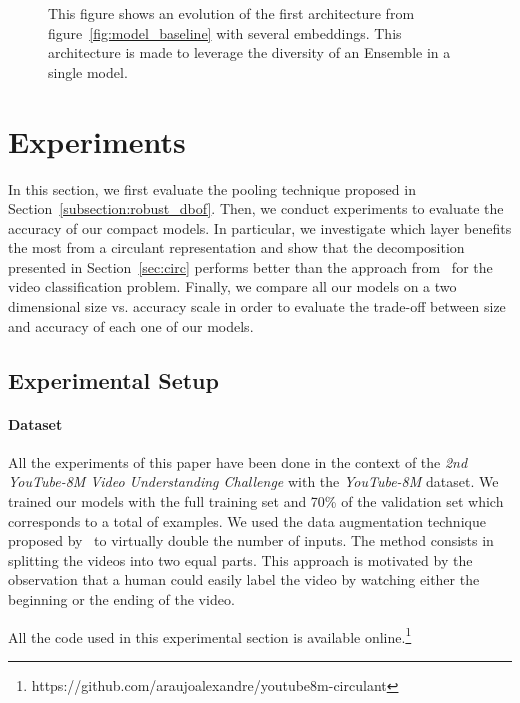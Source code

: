 \documentclass[runningheads]{llncs}
\newcommand{\yt}{\textit{YouTube-8M}\xspace}
\begin{document}
\begin{figure}[ht]
  \centering
  \scalebox{.75}{}
  \caption{This figure shows an evolution of the first architecture from figure~\ref{fig:model_baseline} with several embeddings. This architecture is made to leverage the diversity of an Ensemble in a single model.}
  \label{fig:diverstiy_architecture}
\end{figure}



\section{Experiments}
\label{sec:xp}

In this section, we first evaluate the pooling technique proposed in Section~\ref{subsection:robust_dbof}. Then, we conduct experiments to evaluate the accuracy of our compact models. In particular, we investigate which layer benefits the most from a circulant representation and show that the decomposition presented in Section~\ref{sec:circ} performs better than the  approach from~\cite{7410684} for the video classification problem. Finally, we compare all our models on a two dimensional size vs. accuracy scale in order to evaluate the trade-off between size and accuracy of each one of our models. 


\subsection{Experimental Setup}
\paragraph*{\textbf{Dataset}}
All the experiments of this paper have been done in the context of the \textit{2nd YouTube-8M Video Understanding Challenge} with the \yt dataset. We trained our models with the full training set and 70\% of the validation set which corresponds to a total of  examples. We used the data augmentation technique proposed by~\cite{skalic2017deep} to virtually double the number of inputs. 
The method consists in splitting the videos into two equal parts. This approach is motivated by the observation  that a human could easily label the video by watching either the beginning or the ending of the video. 

All the code used in this experimental section is available online.\footnote{https://github.com/araujoalexandre/youtube8m-circulant}
\end{document}

